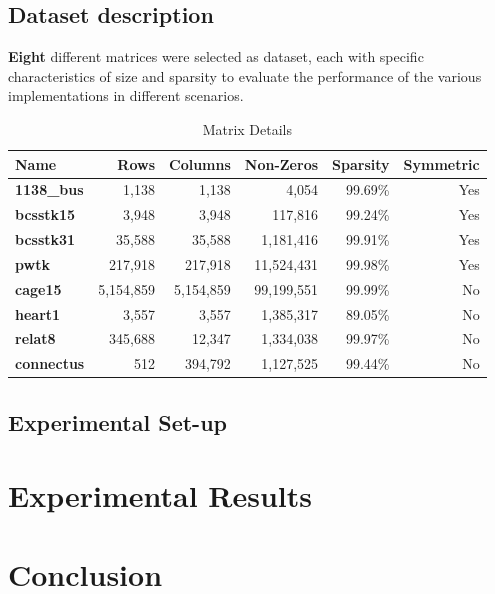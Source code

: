 \documentclass[conference]{IEEEtran}
\begin{document}
        \subsection{Dataset description}
        
        \textbf{Eight} different matrices were selected as dataset, each with
        specific characteristics of size and sparsity to evaluate the
        performance of the various implementations in different scenarios.

        \begin{table}[ht]
            \caption{Matrix Details}
            \label{tab:matrix_details}
            \centering
            \begin{adjustbox}{width=\columnwidth}
            \begin{tabular}{lrrr|rr}
            \toprule
                \textbf{Name} & \textbf{Rows} & \textbf{Columns} & \textbf{Non-Zeros} & \textbf{Sparsity} & \textbf{Symmetric} \\
            \midrule
                \textbf{1138\_bus} & 1,138 & 1,138 & 4,054 & 99.69\% & Yes \\
                \textbf{bcsstk15} & 3,948 & 3,948 & 117,816 & 99.24\% & Yes \\
                \textbf{bcsstk31} & 35,588 & 35,588 & 1,181,416 & 99.91\% & Yes \\
                \textbf{pwtk} & 217,918 & 217,918 & 11,524,431 & 99.98\% & Yes \\
                \textbf{cage15} & 5,154,859 & 5,154,859 & 99,199,551 & 99.99\% & No \\
                \textbf{heart1} & 3,557 & 3,557 & 1,385,317 & 89.05\% & No \\
                \textbf{relat8} & 345,688 & 12,347 & 1,334,038 & 99.97\% & No \\
                \textbf{connectus} & 512 & 394,792 & 1,127,525 & 99.44\% & No \\
            \bottomrule
            \end{tabular}
            \end{adjustbox}
        \end{table}

        \subsection{Experimental Set-up}

    \section{Experimental Results}

    \section{Conclusion}

    
    
\end{document}
